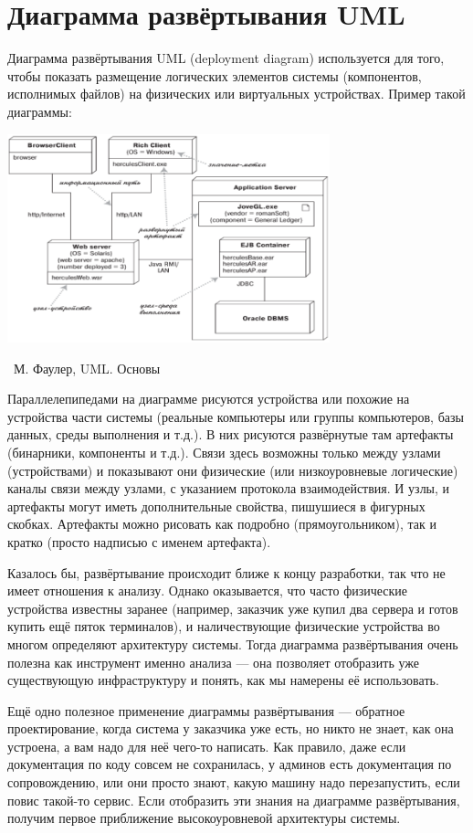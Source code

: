 \documentclass[a5paper]{article}
\newcommand{\attribution}[1] {
    \vspace{-4mm}\begin{flushright}\begin{scriptsize}%
    {\textcopyright\, #1}\end{scriptsize}\end{flushright}
}
\begin{document}
\section{Диаграмма развёртывания UML}

Диаграмма развёртывания UML (deployment diagram) используется для того, чтобы показать размещение логических элементов системы (компонентов, исполнимых файлов) на физических или виртуальных устройствах. Пример такой диаграммы:

\begin{center}
    \includegraphics[width=0.7\textwidth]{deploymentDiagram.png}
    \attribution{М. Фаулер, UML. Основы}
\end{center}

Параллелепипедами на диаграмме рисуются устройства или похожие на устройства части системы (реальные компьютеры или группы компьютеров, базы данных, среды выполнения и т.д.). В них рисуются развёрнутые там артефакты (бинарники, компоненты и т.д.). Связи здесь возможны только между узлами (устройствами) и показывают они физические (или низкоуровневые логические) каналы связи между узлами, с указанием протокола взаимодействия. И узлы, и артефакты могут иметь дополнительные свойства, пишушиеся в фигурных скобках. Артефакты можно рисовать как подробно (прямоугольником), так и кратко (просто надписью с именем артефакта).

Казалось бы, развёртывание происходит ближе к концу разработки, так что не имеет отношения к анализу. Однако оказывается, что часто физические устройства известны заранее (например, заказчик уже купил два сервера и готов купить ещё пяток терминалов), и наличествующие физические устройства во многом определяют архитектуру системы. Тогда диаграмма развёртывания очень полезна как инструмент именно анализа --- она позволяет отобразить уже существующую инфраструктуру и понять, как мы намерены её использовать.

Ещё одно полезное применение диаграммы развёртывания --- обратное проектирование, когда система у заказчика уже есть, но никто не знает, как она устроена, а вам надо для неё чего-то написать. Как правило, даже если документация по коду совсем не сохранилась, у админов есть документация по сопровождению, или они просто знают, какую машину надо перезапустить, если повис такой-то сервис. Если отобразить эти знания на диаграмме развёртывания, получим первое приближение высокоуровневой архитектуры системы.
\end{document}
